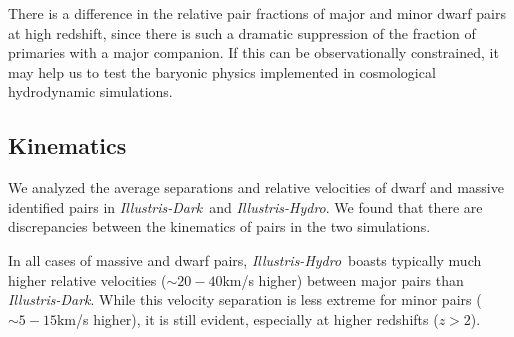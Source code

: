 \documentclass[twocolumn]{aastex63}
\newcommand\ID{\textit{Illustris-Dark}}
\newcommand\IH{\textit{Illustris-Hydro}}
\newcommand{\gb}[1]{\textcolor{olive}{\textbf{#1}} }
\begin{document}
There is a difference 
in the relative pair fractions of major and minor dwarf pairs at high redshift, since there is such a dramatic suppression of the fraction of primaries with a major companion. If this can be observationally constrained, it may help us to test %
the baryonic physics implemented in cosmological hydrodynamic simulations. %



% 
\subsection{Kinematics}\label{sec:kinematics}
 We analyzed the average separations and relative velocities of dwarf and massive identified pairs in \ID\ and \IH. We found that there are discrepancies between the kinematics of pairs in the two simulations. 

 
 In all cases of massive and dwarf pairs, \IH\ boasts typically much higher relative velocities ($\sim20-40$km/s higher) between major pairs than \ID. While this velocity separation is less extreme for minor pairs ($\sim5-15$km/s higher), it is still evident, especially at higher redshifts ($z>2$). 
\end{document}
